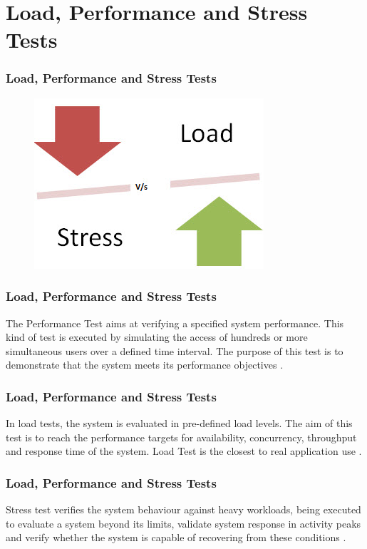 \documentclass{beamer}
\begin{document}
\section{Load, Performance and Stress Tests}

\begin{frame}
\frametitle{Load, Performance and Stress Tests}
\begin{figure}[H]
\centering
\includegraphics[width=0.7\linewidth]{StressTesting1.jpg}
\end{figure}
\end{frame}


\begin{frame}
\frametitle{Load, Performance and Stress Tests}
The Performance Test aims at verifying a specified system performance. This kind of test is executed by simulating the access of hundreds or more simultaneous users over a defined time interval. The purpose of this test is to demonstrate that the system meets its performance objectives \cite{DiLucca2006}\cite{Sandler2004}.
\end{frame}

\begin{frame}
\frametitle{Load, Performance and Stress Tests}
In load tests, the system is evaluated in pre-defined load levels. The aim of this test is to reach the performance targets for availability, concurrency, throughput and response time of the system. Load Test is the closest to real application use \cite{Molyneaux2009}.
\end{frame}


\begin{frame}
\frametitle{Load, Performance and Stress Tests}
Stress test verifies the system behaviour against heavy workloads, being executed to evaluate a system beyond its limits, validate system response in activity peaks and verify whether the system is capable of recovering from these conditions \cite{Sandler2004}.
\end{frame}
\end{document}
